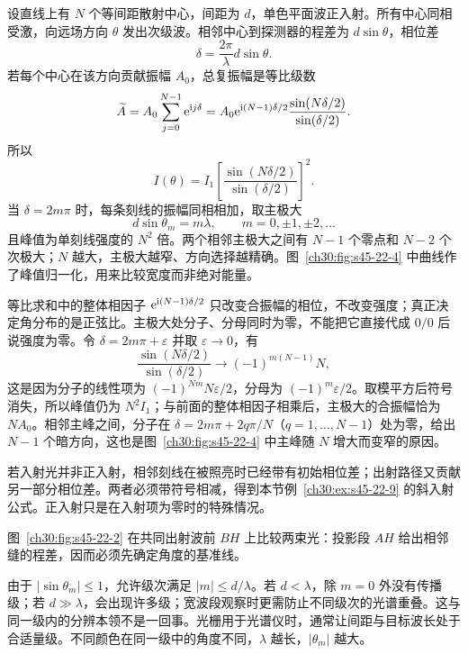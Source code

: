 设直线上有 $N$ 个等间距散射中心，间距为 $d$，单色平面波正入射。所有中心同相受激，向远场方向 $\theta$ 发出次级波。相邻中心到探测器的程差为 $d\sin\theta$，相位差
\begin{equation}
 \delta=\frac{2\pi}{\lambda}d\sin\theta.
\end{equation}
若每个中心在该方向贡献振幅 $A_0$，总复振幅是等比级数
\[
 \widetilde A=A_0\sum_{j=0}^{N-1}\mathrm e^{\mathrm i j\delta}
 =A_0\mathrm e^{\mathrm i(N-1)\delta/2}\frac{\sin(N\delta/2)}{\sin(\delta/2)}.
\]
所以
\begin{equation}
 I(\theta)=I_1\left[\frac{\sin(N\delta/2)}{\sin(\delta/2)}\right]^2.
\end{equation}
当 $\delta=2m\pi$ 时，每条刻线的振幅同相相加，取主极大
\begin{equation}
 d\sin\theta_m=m\lambda,\qquad m=0,\pm1,\pm2,\ldots
\end{equation}
且峰值为单刻线强度的 $N^2$ 倍。两个相邻主极大之间有 $N-1$ 个零点和 $N-2$ 个次极大；$N$ 越大，主极大越窄、方向选择越精确。图~\ref{ch30:fig:s45-22-4} 中曲线作了峰值归一化，用来比较宽度而非绝对能量。

等比求和中的整体相因子 $\mathrm e^{\mathrm i(N-1)\delta/2}$ 只改变合振幅的相位，不改变强度；真正决定角分布的是正弦比。主极大处分子、分母同时为零，不能把它直接代成 $0/0$ 后说强度为零。令 $\delta=2m\pi+\varepsilon$ 并取 $\varepsilon\to0$，有
\[
 \frac{\sin(N\delta/2)}{\sin(\delta/2)}\longrightarrow(-1)^{m(N-1)}N,
\]
这是因为分子的线性项为 $(-1)^{Nm}N\varepsilon/2$，分母为 $(-1)^m\varepsilon/2$。取模平方后符号消失，所以峰值仍为 $N^2I_1$；与前面的整体相因子相乘后，主极大的合振幅恰为 $NA_0$。相邻主峰之间，分子在 $\delta=2m\pi+2q\pi/N$（$q=1,\ldots,N-1$）处为零，给出 $N-1$ 个暗方向，这也是图~\ref{ch30:fig:s45-22-4} 中主峰随 $N$ 增大而变窄的原因。

若入射光并非正入射，相邻刻线在被照亮时已经带有初始相位差；出射路径又贡献另一部分相位差。两者必须带符号相减，得到本节例~\ref{ch30:ex:s45-22-9} 的斜入射公式。正入射只是在入射项为零时的特殊情况。

\GratingDiagram
图~\ref{ch30:fig:s45-22-2} 在共同出射波前 $BH$ 上比较两束光：投影段 $AH$ 给出相邻缝的程差，因而必须先确定角度的基准线。
\SpectrumDiagram
\GratingCurves

由于 $|\sin\theta_m|\le1$，允许级次满足 $|m|\le d/\lambda$。若 $d<\lambda$，除 $m=0$ 外没有传播级；若 $d\gg\lambda$，会出现许多级；宽波段观察时更需防止不同级次的光谱重叠。这与同一级内的分辨本领不是一回事。光栅用于光谱仪时，通常让间距与目标波长处于合适量级。不同颜色在同一级中的角度不同，$\lambda$ 越长，$|\theta_m|$ 越大。

